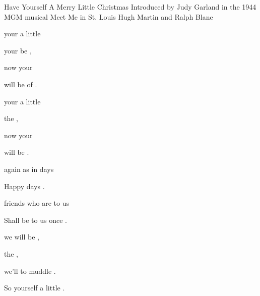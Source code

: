 \begin{SBSong}{Have Yourself A Merry Little Christmas}
    {Introduced by Judy Garland in the 1944 MGM musical Meet Me in St. Louis}
    {Hugh Martin and Ralph Blane}
  \SBDirection{}
  \begin{SBVerse}
     your a  little 
    
     your  be , 
    
     now  your
    
     will be  of .  
  \end{SBVerse}
  \begin{SBVerse}
     your a  little 
    
     the  , 
    
     now  your
    
     will be  . 
  \end{SBVerse}
  \begin{SBVerse}
     again as in  days
    
    Happy  days  .
    
     friends who are  to us
    
    Shall be  to us once . 
  \end{SBVerse}
  \begin{SBVerse}
      we  will be ,
    
     the  , 
    
      we'll  to muddle  .
    
    So  yourself a  little  .
  \end{SBVerse}
\end{SBSong}